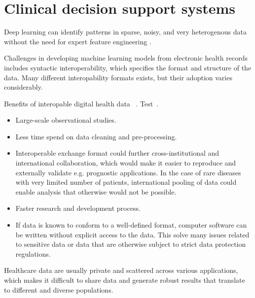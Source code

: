 

\section{Clinical decision support systems}

Deep learning can identify patterns in sparse, noisy,
and very heterogenous data without the need for expert feature engineering
\cite{norgeotCall2019}.

Challenges in developing machine learning models from electronic health records
includes syntactic interoperability, 
which specifies the format and structure of the data.
Many different interopability formats exists, 
but their adoption varies considerably.

Benefits of interopable digital health data
~\autocite{lehneWhy2019}.
Test~\cite{lehneWhy2019}.

\begin{itemize}
    \item Large-scale observational studies.
    \item Less time spend on data cleaning and pre-processing.
    \item Interoperable exchange format could further cross-institutional
    and international collaboration, which would make it easier 
    to reproduce and externally validate e.g. prognostic applications.
    In the case of rare diseases with very limited number of patients, 
    international pooling of data could enable analysis
    that otherwise would not be possible.
    \item Faster research and development process.
    \item If data is known to conform to a well-defined format,
    computer software can be written without explicit access to the data.
    This solve many issues related to sensitive data or
    data that are otherwise subject to strict data protection regulations.
\end{itemize}


Healthcare data are usually private and scattered across various applications,
which makes it difficult to share data and generate robust results 
that translate to different and diverse populations.


